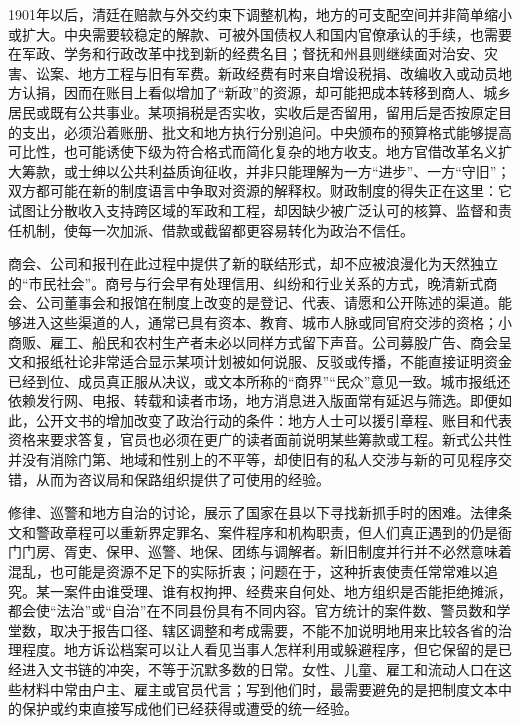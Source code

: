 1901年以后，清廷在赔款与外交约束下调整机构，地方的可支配空间并非简单缩小或扩大。中央需要较稳定的解款、可被外国债权人和国内官僚承认的手续，也需要在军政、学务和行政改革中找到新的经费名目；督抚和州县则继续面对治安、灾害、讼案、地方工程与旧有军费。新政经费有时来自增设税捐、改编收入或动员地方认捐，因而在账目上看似增加了“新政”的资源，却可能把成本转移到商人、城乡居民或既有公共事业。某项捐税是否实收，实收后是否留用，留用后是否按原定目的支出，必须沿着账册、批文和地方执行分别追问。中央颁布的预算格式能够提高可比性，也可能诱使下级为符合格式而简化复杂的地方收支。地方官借改革名义扩大筹款，或士绅以公共利益质询征收，并非只能理解为一方“进步”、一方“守旧”；双方都可能在新的制度语言中争取对资源的解释权。财政制度的得失正在这里：它试图让分散收入支持跨区域的军政和工程，却因缺少被广泛认可的核算、监督和责任机制，使每一次加派、借款或截留都更容易转化为政治不信任。

商会、公司和报刊在此过程中提供了新的联结形式，却不应被浪漫化为天然独立的“市民社会”。商号与行会早有处理信用、纠纷和行业关系的方式，晚清新式商会、公司董事会和报馆在制度上改变的是登记、代表、请愿和公开陈述的渠道。能够进入这些渠道的人，通常已具有资本、教育、城市人脉或同官府交涉的资格；小商贩、雇工、船民和农村生产者未必以同样方式留下声音。公司募股广告、商会呈文和报纸社论非常适合显示某项计划被如何说服、反驳或传播，不能直接证明资金已经到位、成员真正服从决议，或文本所称的“商界”“民众”意见一致。城市报纸还依赖发行网、电报、转载和读者市场，地方消息进入版面常有延迟与筛选。即便如此，公开文书的增加改变了政治行动的条件：地方人士可以援引章程、账目和代表资格来要求答复，官员也必须在更广的读者面前说明某些筹款或工程。新式公共性并没有消除门第、地域和性别上的不平等，却使旧有的私人交涉与新的可见程序交错，从而为咨议局和保路组织提供了可使用的经验。

修律、巡警和地方自治的讨论，展示了国家在县以下寻找新抓手时的困难。法律条文和警政章程可以重新界定罪名、案件程序和机构职责，但人们真正遇到的仍是衙门门房、胥吏、保甲、巡警、地保、团练与调解者。新旧制度并行并不必然意味着混乱，也可能是资源不足下的实际折衷；问题在于，这种折衷使责任常常难以追究。某一案件由谁受理、谁有权拘押、经费来自何处、地方组织是否能拒绝摊派，都会使“法治”或“自治”在不同县份具有不同内容。官方统计的案件数、警员数和学堂数，取决于报告口径、辖区调整和考成需要，不能不加说明地用来比较各省的治理程度。地方诉讼档案可以让人看见当事人怎样利用或躲避程序，但它保留的是已经进入文书链的冲突，不等于沉默多数的日常。女性、儿童、雇工和流动人口在这些材料中常由户主、雇主或官员代言；写到他们时，最需要避免的是把制度文本中的保护或约束直接写成他们已经获得或遭受的统一经验。

